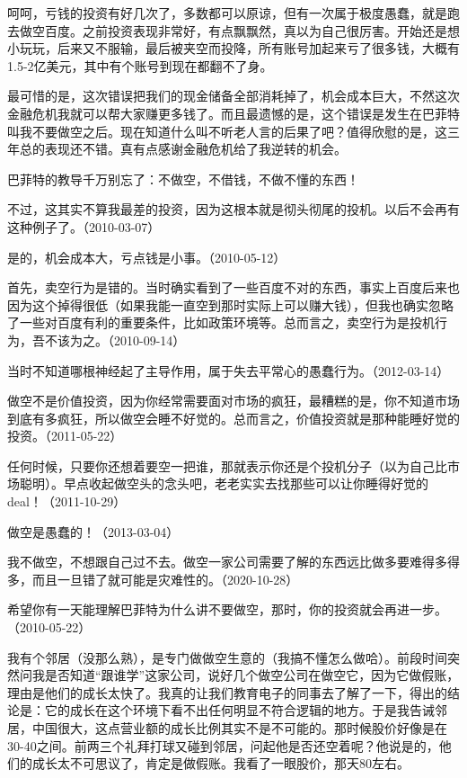 
呵呵，亏钱的投资有好几次了，多数都可以原谅，但有一次属于极度愚蠢，就是跑去做空百度。之前投资表现非常好，有点飘飘然，真以为自己很厉害。开始还是想小玩玩，后来又不服输，最后被夹空而投降，所有账号加起来亏了很多钱，大概有1.5-2亿美元，其中有个账号到现在都翻不了身。

最可惜的是，这次错误把我们的现金储备全部消耗掉了，机会成本巨大，不然这次金融危机我就可以帮大家赚更多钱了。而且最遗憾的是，这个错误是发生在巴菲特叫我不要做空之后。现在知道什么叫不听老人言的后果了吧？值得欣慰的是，这三年总的表现还不错。真有点感谢金融危机给了我逆转的机会。

巴菲特的教导千万别忘了：不做空，不借钱，不做不懂的东西！

不过，这其实不算我最差的投资，因为这根本就是彻头彻尾的投机。以后不会再有这种例子了。（2010-03-07）


是的，机会成本大，亏点钱是小事。（2010-05-12）


首先，卖空行为是错的。当时确实看到了一些百度不对的东西，事实上百度后来也因为这个掉得很低（如果我能一直空到那时实际上可以赚大钱），但我也确实忽略了一些对百度有利的重要条件，比如政策环境等。总而言之，卖空行为是投机行为，吾不该为之。（2010-09-14）

当时不知道哪根神经起了主导作用，属于失去平常心的愚蠢行为。（2012-03-14）


做空不是价值投资，因为你经常需要面对市场的疯狂，最糟糕的是，你不知道市场到底有多疯狂，所以做空会睡不好觉的。总而言之，价值投资就是那种能睡好觉的投资。（2011-05-22）

任何时候，只要你还想着要空一把谁，那就表示你还是个投机分子（以为自己比市场聪明）。早点收起做空头的念头吧，老老实实去找那些可以让你睡得好觉的deal！（2011-10-29）

做空是愚蠢的！（2013-03-04）

我不做空，不想跟自己过不去。做空一家公司需要了解的东西远比做多要难得多得多，而且一旦错了就可能是灾难性的。（2020-10-28）

希望你有一天能理解巴菲特为什么讲不要做空，那时，你的投资就会再进一步。（2010-05-22）

我有个邻居（没那么熟），是专门做做空生意的（我搞不懂怎么做哈）。前段时间突然问我是否知道“跟谁学”这家公司，说好几个做空公司在做空它，因为它做假账，理由是他们的成长太快了。我真的让我们教育电子的同事去了解了一下，得出的结论是：它的成长在这个环境下看不出任何明显不符合逻辑的地方。于是我告诫邻居，中国很大，这点营业额的成长比例其实不是不可能的。那时候股价好像是在30-40之间。前两三个礼拜打球又碰到邻居，问起他是否还空着呢？他说是的，他们的成长太不可思议了，肯定是做假账。我看了一眼股价，那天80左右。

